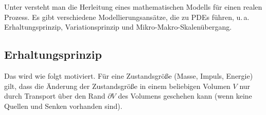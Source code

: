 \begin{Bem}
    Unter  versteht man die Herleitung eines mathematischen Modells für einen
    realen Prozess.
    Es gibt verschiedene Modellierungsansätze, die zu PDEs führen,
    u.\,a. Erhaltungsprinzip, Variationsprinzip und Mikro-Makro-Skalenübergang.
\end{Bem}

\subsection{%
    Erhaltungsprinzip%
}

\begin{Bem}
    Das  wird wie folgt motiviert.
    Für eine Zustandsgröße (Masse, Impuls, Energie) gilt, dass die Änderung der Zustandsgröße
    in einem beliebigen Volumen $V$ nur durch Transport über den Rand $\partial V$ des Volumens
    geschehen kann (wenn keine Quellen und Senken vorhanden sind).
\end{Bem}

\linie

